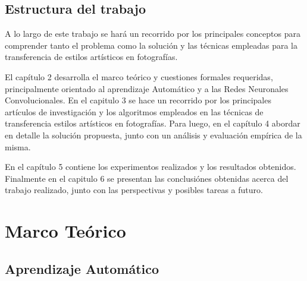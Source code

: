 \documentclass[a4paper,11pt,spanish]{book}
\begin{document}
  \section {Estructura del trabajo}
    A lo largo de este trabajo se hará un recorrido por los principales conceptos para comprender tanto el problema como la solución y las técnicas empleadas para la transferencia
    de estilos artísticos en fotografías.

    El capítulo 2 desarrolla el marco teórico y cuestiones formales requeridas, principalmente orientado al aprendizaje Automático y a las Redes Neuronales Convolucionales.
    En el capitulo 3 se hace un recorrido por los principales artículos de investigación y los algoritmos empleados en las técnicas de transferencia estilos artísticos en fotografías.
    Para luego, en el capítulo 4 abordar en detalle la solución propuesta, junto con un análisis y evaluación empírica de la misma.

    En el capítulo 5 contiene los experimentos realizados y los resultados obtenidos. Finalmente en el capitulo 6 se  presentan las conclusiónes obtenidas acerca del trabajo realizado,
    junto con las perspectivas y posibles tareas a futuro.

\chapter{Marco Teórico}




  \section{Aprendizaje Automático}
\end{document}
